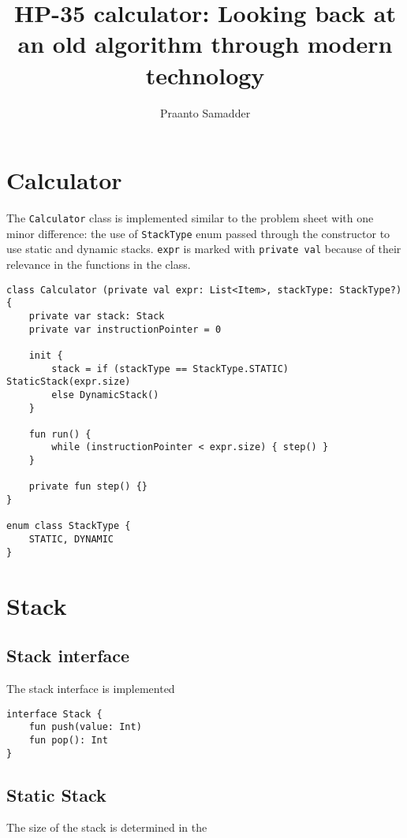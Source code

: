 \documentclass{article}
\title{HP-35 calculator: Looking back at an old algorithm through modern technology}
\author{Praanto Samadder}
\begin{document}
\maketitle



\section{Calculator}
The \texttt{Calculator} class is implemented similar to the problem sheet with one minor difference: the use of \texttt{StackType} enum passed through the constructor to use static and dynamic stacks. \texttt{expr} is marked with \texttt{private val} because of their relevance in the functions in the class.

\begin{verbatim}
class Calculator (private val expr: List<Item>, stackType: StackType?){
    private var stack: Stack
    private var instructionPointer = 0
    
    init {
        stack = if (stackType == StackType.STATIC) StaticStack(expr.size)
        else DynamicStack()
    }

    fun run() {
        while (instructionPointer < expr.size) { step() }
    }

    private fun step() {}
}

enum class StackType {
    STATIC, DYNAMIC
}

\end{verbatim}



\section{Stack}
\subsection{Stack interface}
The stack interface is implemented 

\begin{verbatim}
interface Stack {
    fun push(value: Int)
    fun pop(): Int
}
\end{verbatim}

\subsection{Static Stack}
The size of the stack is determined in the 
\end{document}

